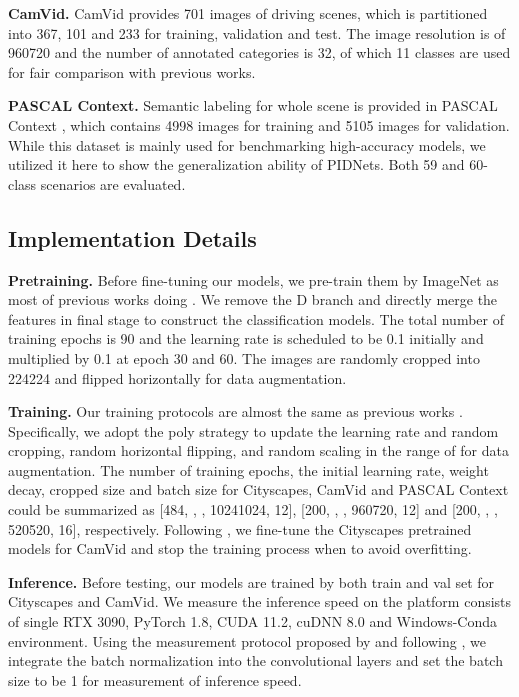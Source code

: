 \documentclass[10pt,twocolumn,letterpaper]{article}
\begin{document}
\noindent
\textbf{CamVid.} CamVid \cite{camvid} provides 701 images of driving scenes, which is partitioned into 367, 101 and 233 for training, validation and test. The image resolution is of 960720 and the number of annotated categories is 32, of which 11 classes are used for fair comparison with previous works.

\noindent
\textbf{PASCAL Context.} Semantic labeling for whole scene is provided in PASCAL Context \cite{pascal_context}, which contains 4998 images for training and 5105 images for validation. While this dataset is mainly used for benchmarking high-accuracy models, we utilized it here to show the generalization ability of PIDNets. Both 59 and 60-class scenarios are evaluated.

\subsection{Implementation Details}
\noindent
\textbf{Pretraining.} Before fine-tuning our models, we pre-train them by ImageNet \cite{imagenet} as most of previous works doing \cite{ddrnet, hyperseg,swiftnet}. We remove the D branch and directly merge the features in final stage to construct the classification models. The total number of training epochs is 90 and the learning rate is scheduled to be 0.1 initially and multiplied by 0.1 at epoch 30 and 60. The images are randomly cropped into 224224 and flipped horizontally for data augmentation.

\noindent
\textbf{Training.} Our training protocols are almost the same as previous works \cite{bisenet, ddrnet, stdc}. Specifically, we adopt the poly strategy to update the learning rate and random cropping, random horizontal flipping, and random scaling in the range of  for data augmentation. The number of training epochs, the initial learning rate, weight decay, cropped size and batch size for Cityscapes, CamVid and PASCAL Context could be summarized as [484, , , 10241024, 12], [200, , , 960720, 12] and [200, , , 520520, 16], respectively. Following \cite{bisenetv2, ddrnet}, we fine-tune the Cityscapes pretrained models for CamVid and stop the training process when  to avoid overfitting.

\noindent
\textbf{Inference.} Before testing, our models are trained by both train and val set for Cityscapes and CamVid. We measure the inference speed on the platform consists of single RTX 3090, PyTorch 1.8, CUDA 11.2, cuDNN 8.0 and Windows-Conda environment. Using the measurement protocol proposed by \cite{fasterseg} and following \cite{ddrnet, swiftnet, msfnet}, we integrate the batch normalization into the convolutional layers and set the batch size to be 1 for measurement of inference speed. 
\end{document}
